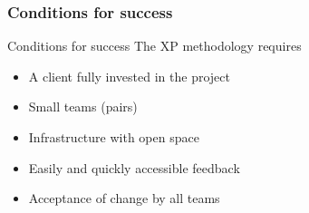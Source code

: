 \begin{frame}
    \frametitle{Conditions for success}
        \begin{block}{Conditions for success}
        The XP methodology requires            
            \begin{itemize}
                \item A client fully invested in the project
                \item Small teams (pairs)
                \item Infrastructure with open space
                \item Easily and quickly accessible feedback
                \item Acceptance of change by all teams
            \end{itemize}
        \end{block}
\end{frame}
